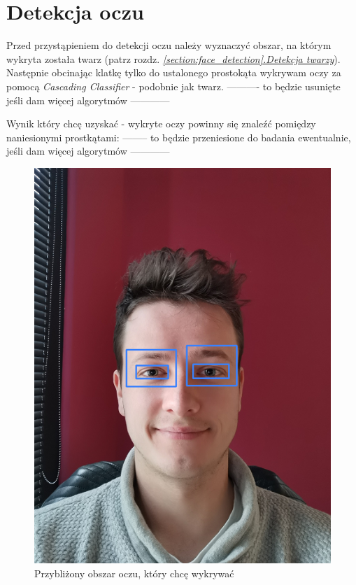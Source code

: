 \newpage

\section{Detekcja oczu} \label{section:eye_detection}

Przed przystąpieniem do detekcji oczu należy wyznaczyć obszar, na którym wykryta została twarz (patrz rozdz. \hyperref[{section:face_detection}]{\textit{\ref{section:face_detection}.Detekcja twarzy}}).
\\
Następnie obcinając klatkę tylko do ustalonego prostokąta wykrywam oczy za pomocą \textit{Cascading Classifier} - podobnie jak twarz.
---------- to będzie usunięte jeśli dam więcej algorytmów ------------

Wynik który chcę uzyskać - wykryte oczy powinny się znaleźć pomiędzy naniesionymi prostkątami:
-------- to będzie przeniesione do badania ewentualnie, jeśli dam więcej algorytmów ------------

\begin{figure}[!h]
    \begin{center}
        \includegraphics[scale=0.6]{img/pupil_section/expected_eyes_region.png}
        \caption{Przybliżony obszar oczu, który chcę wykrywać}
        \label{fig:expected_eyes_region}
    \end{center}
\end{figure}

